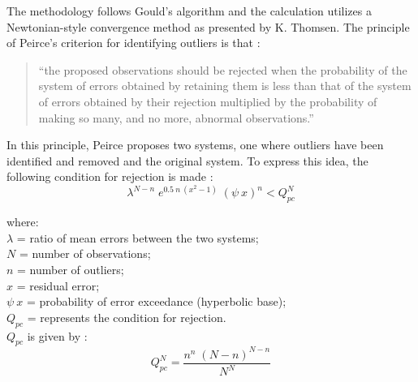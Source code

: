 The methodology follows Gould's algorithm and the calculation utilizes a Newtonian-style convergence method as presented by K. Thomsen\footnotemark.  
The principle of Peirce's criterion for identifying outliers is that \parencite{peirce52}:
\begin{quote}
``the proposed observations should be rejected when the probability of the system of errors obtained by retaining them is less than that of the system of errors obtained by their rejection multiplied by the probability of making so many, and no more, abnormal observations.''
\end{quote}

In this principle, Peirce proposes two systems, one where outliers have been identified and removed and the original system.  
To express this idea, the following condition for rejection is made \parencite[Eq. A]{gould55}:
\begin{equation}
\label{eq:goulda}
    \lambda^{N-n}\; e^{0.5\: n\: (x^{2}-1)}\; \left(\psi\: x\right)^{n} < Q_{pc}^{N}
\end{equation}

\noindent where: \\
\indent $\lambda$ = ratio of mean errors between the two systems;\\
\indent $N$ = number of observations;\\
\indent $n$ = number of outliers;\\
\indent $x$ = residual error;\\
\indent $\psi\: x$ = probability of error exceedance (hyperbolic base);\\
\indent $Q_{pc}$ = represents the condition for rejection.\\ 

\noindent $Q_{pc}$ is given by \parencite[Eq. B]{gould55}:
\begin{equation}
\label{eq:gouldb}
    Q_{pc}^{N} = \frac{n^{n}\;(N-n)^{N-n}}{N^{N}}
\end{equation}

